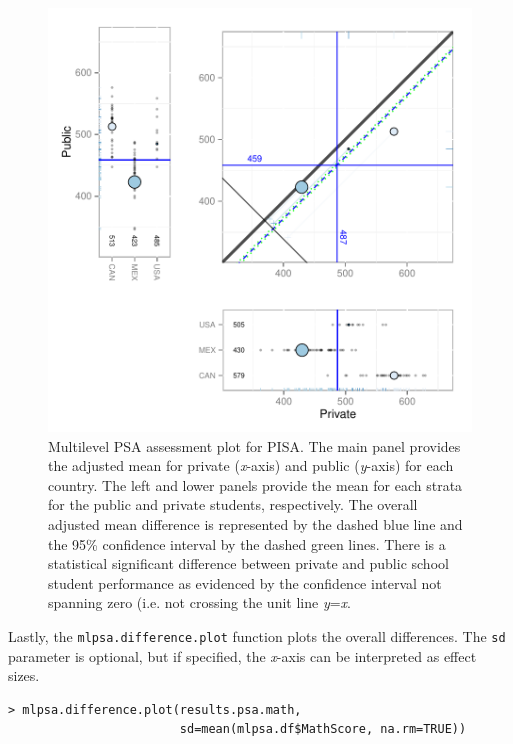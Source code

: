 \documentclass[letterpaper,12p,twoside]{article} %
\begin{document}
\begin{figure}[h!]
\begin{center}
\includegraphics[width=\textwidth]{../Figures/pisamlpsa.pdf}
\caption[Multilevel PSA assessment plot for PISA]{Multilevel PSA assessment plot for PISA. The main panel provides the adjusted mean for private (\textit{x}-axis) and public (\textit{y}-axis) for each country. The left and lower panels provide the mean for each strata for the public and private students, respectively. The overall adjusted mean difference is represented by the dashed blue line and the 95\% confidence interval by the dashed green lines. There is a statistical significant difference between private and public school student performance as evidenced by the confidence interval not spanning zero (i.e. not crossing the unit line \textit{y}=\textit{x}.}
\end{center}
\end{figure}

\clearpage
Lastly, the \texttt{mlpsa.difference.plot} function plots the overall differences. The \texttt{sd} parameter is optional, but if specified, the \textit{x}-axis can be interpreted as effect sizes.

\begin{verbatim}
> mlpsa.difference.plot(results.psa.math, 
                        sd=mean(mlpsa.df$MathScore, na.rm=TRUE))
\end{verbatim}
\end{document}
